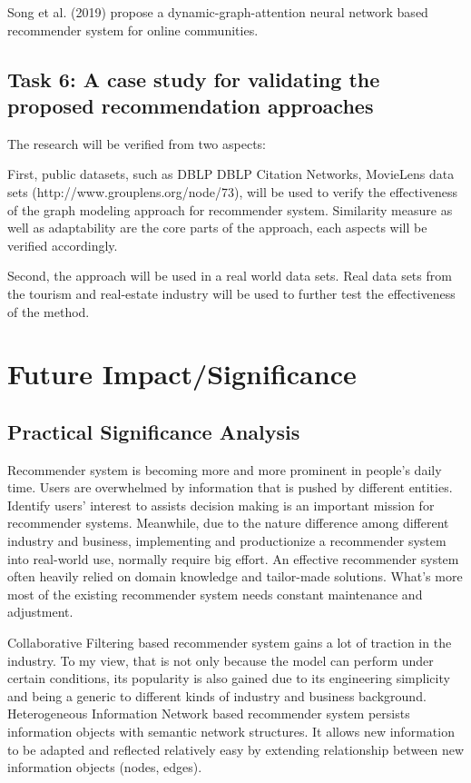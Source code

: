 \documentclass[12pt,a4 paper,title page]{article}
\begin{document}
Song et al. (2019) propose a dynamic-graph-attention neural network based recommender system for online communities.


\subsection{Task 6:  A case study for validating the proposed recommendation approaches}

The research will be verified from two aspects: 

First, public datasets, such as DBLP DBLP Citation Networks, MovieLens data sets (http://www.grouplens.org/node/73), will be used to verify the effectiveness of the graph modeling approach for recommender system. Similarity measure as well as adaptability are the core parts of the approach, each aspects will be verified accordingly. 

Second, the approach will be used in a real world data sets. Real data sets from the tourism and real-estate industry will be used to further test the effectiveness of the method.




\section{Future Impact/Significance}

\subsection{Practical Significance Analysis}
Recommender system is becoming more and more prominent in people's daily time. Users are overwhelmed by information that is pushed by different entities. Identify users' interest to assists decision making is an important mission for recommender systems. Meanwhile, due to the nature difference among different industry and business, implementing and productionize a recommender system into real-world use, normally require big effort. An effective recommender system often heavily relied on domain knowledge and tailor-made solutions. What's more most of the existing recommender system needs constant maintenance and adjustment.  

Collaborative Filtering based recommender system gains a lot of traction in the industry. To my view, that is not only because the model can perform under certain conditions, its popularity is also gained due to its engineering simplicity and being a generic to different kinds of industry and business background. Heterogeneous Information Network based recommender system persists information objects with semantic network structures. It allows new information to be adapted and reflected relatively easy by extending relationship between new information objects (nodes, edges).  
\end{document}

